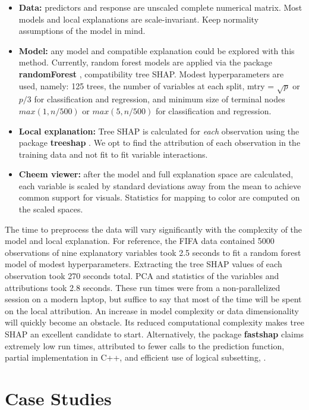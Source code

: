 \documentclass[
]{jss}
\providecommand{\tightlist}{%
  \setlength{\itemsep}{0pt}\setlength{\parskip}{0pt}}
\begin{document}
\begin{itemize}
\tightlist
\item
  \textbf{Data:} predictors and response are unscaled complete numerical matrix. Most models and local explanations are scale-invariant. Keep normality assumptions of the model in mind.
\item
  \textbf{Model:} any model and compatible explanation could be explored with this method. Currently, random forest models are applied via the package \textbf{randomForest} \citep{liaw_classification_2002}, compatibility tree SHAP. Modest hyperparameters are used, namely: 125 trees, the number of variables at each split, mtry = \(\sqrt{p}\) or \(p/3\) for classification and regression, and minimum size of terminal nodes \(max(1, n/500)\) or \(max(5, n/500)\) for classification and regression.
\item
  \textbf{Local explanation:} Tree SHAP is calculated for \emph{each} observation using the package \textbf{treeshap} \citep{kominsarczyk_treeshap_2021}. We opt to find the attribution of each observation in the training data and not fit to fit variable interactions.
\item
  \textbf{Cheem viewer:} after the model and full explanation space are calculated, each variable is scaled by standard deviations away from the mean to achieve common support for visuals. Statistics for mapping to color are computed on the scaled spaces.
\end{itemize}

The time to preprocess the data will vary significantly with the complexity of the model and local explanation. For reference, the FIFA data contained 5000 observations of nine explanatory variables took 2.5 seconds to fit a random forest model of modest hyperparameters. Extracting the tree SHAP values of each observation took 270 seconds total. PCA and statistics of the variables and attributions took 2.8 seconds. These run times were from a non-parallelized session on a modern laptop, but suffice to say that most of the time will be spent on the local attribution. An increase in model complexity or data dimensionality will quickly become an obstacle. Its reduced computational complexity makes tree SHAP an excellent candidate to start. Alternatively, the package \textbf{fastshap} claims extremely low run times, attributed to fewer calls to the prediction function, partial implementation in C++, and efficient use of logical subsetting, \citet{greenwell_fastshap_2020}.

\hypertarget{sec:casestudies}{%
\section{Case Studies}\label{sec:casestudies}}
\end{document}
